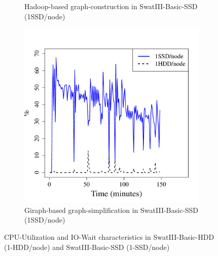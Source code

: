 \documentclass[conference]{IEEEtran}
\begin{document}
\begin{figure}[htb]
\begin{subfigure}[b]{0.23\textwidth}
                \caption{Hadoop-based graph-construction in SwatIII-Basic-SSD (1SSD/node)}
                \label{fig:BGCPUSSD}
        \end{subfigure}    
        \begin{subfigure}[b]{0.23\textwidth}
                \includegraphics[width=\textwidth]{Figure/SystemData/Plots/ECCPUSSD.pdf}
                \caption{Giraph-based graph-simplification in SwatIII-Basic-SSD (1SSD/node)}
                \label{fig:ECCPUSSD}
        \end{subfigure}
        \caption{CPU-Utilization and IO-Wait characteristics in SwatIII-Basic-HDD (1-HDD/node) and SwatIII-Basic-SSD (1-SSD/node)}\label{fig:HddSsdCPU}
        \vspace{-1.5em}
\end{figure}
\end{document}
